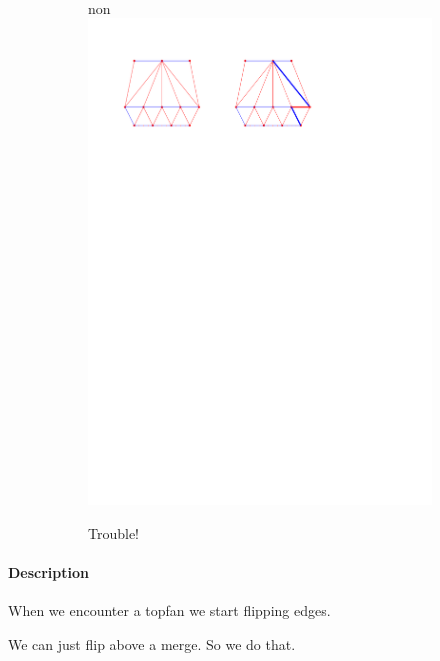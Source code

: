 \begin{figure}
\begin{subfigure}[b]{0.45 \textwidth}
    \end{subfigure}
    ~
    \begin{subfigure}[b]{0.45 \textwidth}non
        \includegraphics[width =\textwidth]{topFanFlips/img/splitfront}
        \caption{Trouble!}
        \label{fig:fanflip:splitFirstVertex}

    \end{subfigure}

    \caption{}
    \label{fig:fanflip:fanflips}
\end{figure}


\paragraph{Description}
When we encounter a topfan we start flipping edges.

We can just flip above a merge. So we do that.

